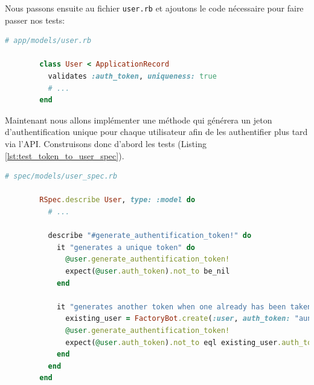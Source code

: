 \documentclass[]{report}
\begin{document}
      Nous passons ensuite au fichier \verb|user.rb| et ajoutons le code nécessaire pour faire passer nos tests:

      \begin{scriptsize}
        \begin{lstlisting}[language=ruby]
        # app/models/user.rb

        class User < ApplicationRecord
          validates :auth_token, uniqueness: true
          # ...
        end
        \end{lstlisting}
      \end{scriptsize}

      Maintenant nous allons implémenter une méthode qui générera un jeton d'authentification unique pour chaque utilisateur afin de les authentifier plus tard via l'API. Construisons donc d'abord les tests (Listing \ref{lst:test_token_to_user_spec}).

      \begin{scriptsize}
        \begin{lstlisting}[language=ruby, caption={Test de la génération automatique du jeton d'authentification}, label={lst:test_token_to_user_spec}]
        # spec/models/user_spec.rb

        RSpec.describe User, type: :model do
          # ...

          describe "#generate_authentification_token!" do
            it "generates a unique token" do
              @user.generate_authentification_token!
              expect(@user.auth_token).not_to be_nil
            end

            it "generates another token when one already has been taken" do
              existing_user = FactoryBot.create(:user, auth_token: "auniquetoken123")
              @user.generate_authentification_token!
              expect(@user.auth_token).not_to eql existing_user.auth_token
            end
          end
        end
        \end{lstlisting}
      \end{scriptsize}
\end{document}
